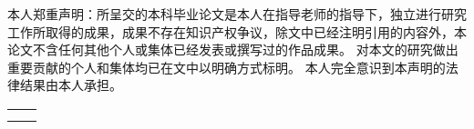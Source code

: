 
\begin{declarationzh}
	
本人郑重声明：所呈交的本科毕业论文是本人在指导老师的指导下，独立进行研究工作所取得的成果，成果不存在知识产权争议，除文中已经注明引用的内容外，本论文不含任何其他个人或集体已经发表或撰写过的作品成果。
对本文的研究做出重要贡献的个人和集体均已在文中以明确方式标明。
本人完全意识到本声明的法律结果由本人承担。

	
	\vspace{30pt}
	\begin{tabular}{ll}
		\hspace{240pt} \makebox[4em][s]{作者签名：} & \underline{\makebox[100pt][c]{  }} \\
		\hspace{240pt} \makebox[4em][s]{日\qquad 期:}	 &
		\underline{\makebox[100pt][c]{\qquad 年\quad 月\quad   日 }} \\
	\end{tabular}

	
	
\end{declarationzh}